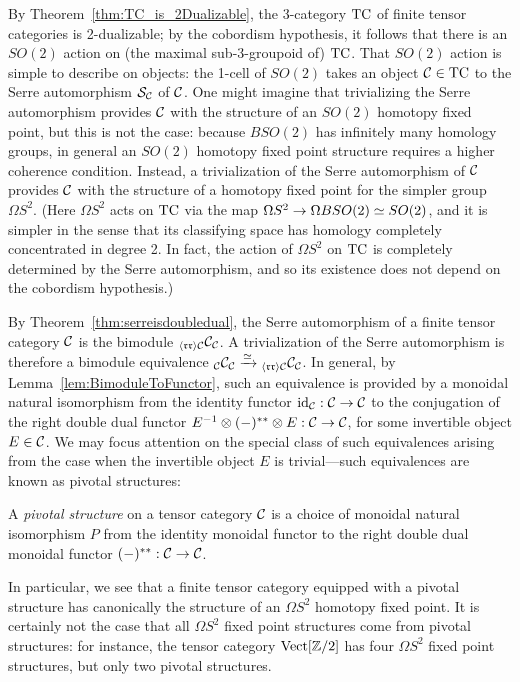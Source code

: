 \documentclass{amsart}
\begin{document}
By Theorem~\ref{thm:TC_is_2Dualizable}, the 3-category $\mathrm{TC}$ of finite tensor categories is 2-dualizable; by the cobordism hypothesis, it follows that there is an $SO(2)$ action on (the maximal sub-3-groupoid of) $\mathrm{TC}$.  That $SO(2)$ action is simple to describe on objects: the 1-cell of $SO(2)$ takes an object $\mathcal C \in \mathrm{TC}$ to the Serre automorphism $\mathcal S_\mathcal C$ of $\mathcal C$.  One might imagine that trivializing the Serre automorphism provides $\mathcal C$ with the structure of an $SO(2)$ homotopy fixed point, but this is not the case: because $BSO(2)$ has infinitely many homology groups, in general an $SO(2)$ homotopy fixed point structure requires a higher coherence condition.  Instead, a trivialization of the Serre automorphism of $\mathcal C$ provides $\mathcal C$ with the structure of a homotopy fixed point for the simpler group $\Omega S^2$.  (Here $\Omega S^2$ acts on $\mathrm{TC}$ via the map $\Omega S^2 \rightarrow \Omega B SO(2) \simeq SO(2)$, and it is simpler in the sense that its classifying space has homology completely concentrated in degree 2.  In fact, the action of $\Omega S^2$ on $\mathrm{TC}$ is completely determined by the Serre automorphism, and so its existence does not depend on the cobordism hypothesis.)


By Theorem~\ref{thm:serreisdoubledual}, the Serre automorphism of a finite tensor category $\mathcal C$ is the bimodule ${}_{\langle \mathfrak{r r} \rangle \mathcal C} \mathcal C_\mathcal C$.  A trivialization of the Serre automorphism is therefore a bimodule equivalence ${}_\mathcal C \mathcal C_\mathcal C \xrightarrow{\simeq} {}_{\langle \mathfrak{r r} \rangle \mathcal C} \mathcal C_\mathcal C$.  In general, by Lemma~\ref{lem:BimoduleToFunctor}, such an equivalence is provided by a monoidal natural isomorphism from the identity functor $\mathrm{id}_\mathcal C : \mathcal C \rightarrow \mathcal C$ to the conjugation of the right double dual functor $E^{-1} \otimes (-)^{**} \otimes E: \mathcal C \rightarrow \mathcal C$, for some invertible object $E \in \mathcal C$.  We may focus attention on the special class of such equivalences arising from the case when the invertible object $E$ is trivial---such equivalences are known as pivotal structures:
\begin{definition}
A \emph{pivotal structure} on a tensor category $\mathcal C$ is a choice of monoidal natural isomorphism $P$ from the identity monoidal functor to the right double dual monoidal functor $(-)^{**}: \mathcal C \rightarrow \mathcal C$.
\end{definition}
\nid In particular, we see that a finite tensor category equipped with a pivotal structure has canonically the structure of an $\Omega S^2$ homotopy fixed point.  It is certainly not the case that all $\Omega S^2$ fixed point structures come from pivotal structures: for instance, the tensor category $\mathrm{Vect}[\mathbb Z/2]$ has four $\Omega S^2$ fixed point structures, but only two pivotal structures.
\end{document}
